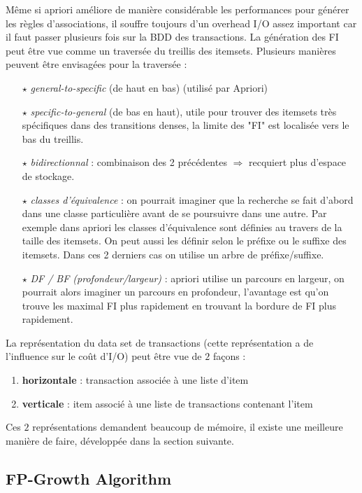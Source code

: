 \documentclass{article}
\begin{document}
\begin{sffamily}
Même si apriori améliore de manière considérable les performances pour générer les règles d'associations, il souffre toujours d'un overhead 
I/O assez important car il faut passer plusieurs fois sur la BDD des transactions. La génération des FI peut être vue comme un traversée du
treillis des itemsets. Plusieurs manières peuvent être envisagées pour la traversée : 
\begin{itemize}
\item[$\star$] \textit{general-to-specific} (de haut en bas) (utilisé par Apriori)
\item[$\star$] \textit{specific-to-general} (de bas en haut), utile pour trouver des itemsets très spécifiques dans des transitions denses, 
la limite des "FI" est localisée vers le bas du treillis.
\item[$\star$] \textit{bidirectionnal} : combinaison des 2 précédentes $\Rightarrow$ recquiert plus d'espace de stockage.
\item[$\star$] \textit{classes d'équivalence} : on pourrait imaginer que la recherche se fait d'abord dans une classe particulière avant de 
se poursuivre dans une autre. Par exemple dans apriori les classes d'équivalence sont définies au travers de la taille des itemsets. On 
peut aussi les définir selon le préfixe ou le suffixe des itemsets. Dans ces 2 derniers cas on utilise un arbre de préfixe/suffixe.
\item[$\star$] \textit{DF / BF (profondeur/largeur)} : apriori utilise un parcours en largeur, on pourrait alors imaginer un parcours en 
profondeur, l'avantage est qu'on trouve les maximal FI plus rapidement en trouvant la bordure de FI plus rapidement.
\end{itemize}

La représentation du data set de transactions (cette représentation a de l'influence sur le coût d'I/O) peut être vue de $2$ façons :
\begin{enumerate}
\item \textbf{horizontale} : transaction associée à une liste d'item
\item \textbf{verticale} : item associé à une liste de transactions contenant l'item
\end{enumerate}
Ces $2$ représentations demandent beaucoup de mémoire, il existe une meilleure manière de faire, développée dans la section suivante.

\subsection{FP-Growth Algorithm}


\end{sffamily}
\end{document}
